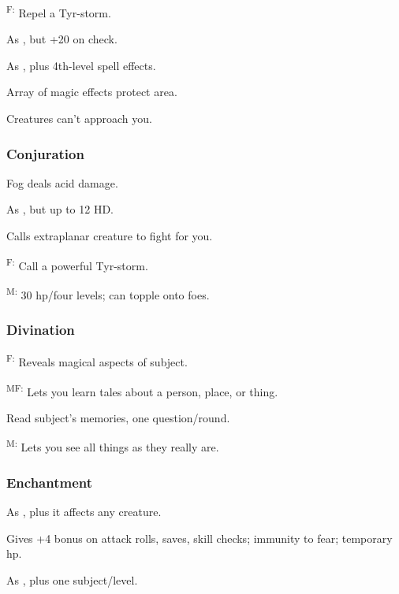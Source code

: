 	\textsuperscript{F:} Repel a Tyr-storm. %

	 As , but +20 on check.

	 As , plus 4th-level spell effects.

	 Array of magic effects protect area.

	 Creatures can't approach you.

\subsubsection{Conjuration}
	 Fog deals acid damage.

	 As , but up to 12 HD.

	 Calls extraplanar creature to fight for you.

	\textsuperscript{F:} Call a powerful Tyr-storm. %

	\textsuperscript{M:} 30 hp/four levels; can topple onto foes.

\subsubsection{Divination}
	\textsuperscript{F:} Reveals magical aspects of subject.

	\textsuperscript{MF:} Lets you learn tales about a person, place, or thing.

	 Read subject's memories, one question/round.

	\textsuperscript{M:} Lets you see all things as they really are.

\subsubsection{Enchantment}
	 As , plus it affects any creature.

	 Gives +4 bonus on attack rolls, saves, skill checks; immunity to fear; temporary hp.

	 As , plus one subject/level.

